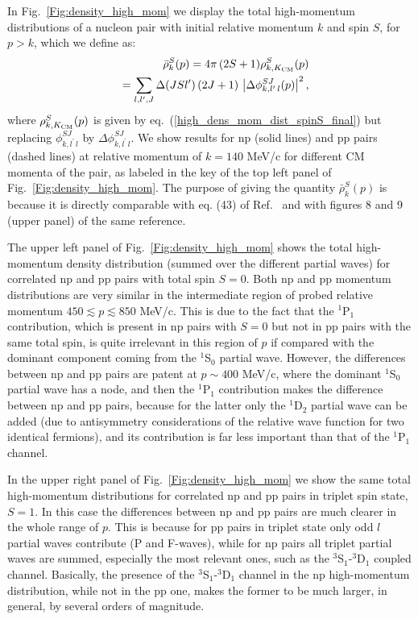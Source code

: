 \documentclass[aps,twocolumn,showpacs,preprintnumbers,amsmath,amssymb,nofootinbib,superscriptaddress,showkeys,noeprint]{revtex4-1}
\begin{document}
In Fig.~\ref{Fig:density_high_mom} we display the total high-momentum
distributions of a nucleon pair with initial relative momentum $k$ and
spin $S$, for $p>k$, which we define as:
\begin{eqnarray}
&&\bar{\rho}^{S}_{k}(p)=
4\pi\,(2S+1)
\rho^{S}_{k,K_{\rm CM}}(p)
\nonumber\\
&&=\sum_{l,l^\prime,J}
\Delta(JSl^\prime)\,(2J+1)\,
\left|\Delta\phi^{SJ}_{k,l^\prime\,l}(p)\right|^2,
\label{high_density_mom_dist_spin}
\end{eqnarray} 
where $\rho^{S}_{k,K_{\rm CM}}(p)$ is given by
eq.~(\ref{high_dens_mom_dist_spinS_final}) but replacing
$\phi^{SJ}_{k,l^\prime\,l}$ by $\Delta\phi^{SJ}_{k,l^\prime\,l}$.  We
show results for np (solid lines) and pp pairs (dashed lines) at
relative momentum of $k=140$ MeV/c for different CM momenta of the
pair, as labeled in the key of the top left panel of
Fig.~\ref{Fig:density_high_mom}.  The purpose of giving the quantity
$\bar{\rho}^{S}_{k}(p)$ is because it is directly comparable with
eq. (43) of Ref.~\cite{RuizSimo:2017tcb} and with figures 8 and 9
(upper panel) of the same reference.

The upper left panel of Fig.~\ref{Fig:density_high_mom} shows the
total high-momentum density distribution (summed over the different
partial waves) for correlated np and pp pairs with total spin $S=0$.
Both np and pp momentum distributions are very similar in the
intermediate region of probed relative momentum $450\lesssim p
\lesssim 850$ MeV/c. This is due to the fact that the ${}^{1}$P$_1$
contribution, which is present in np pairs with $S=0$ but not in pp
pairs with the same total spin, is quite irrelevant in this region of
$p$ if compared with the dominant component coming from the
${}^{1}$S$_0$ partial wave. However, the differences between np and pp
pairs are patent at $p\sim 400$ MeV/c, where the dominant
${}^{1}$S$_0$ partial wave has a node, and then the ${}^{1}$P$_1$
contribution makes the difference between np and pp pairs, because for
the latter only the ${}^{1}$D$_2$ partial wave can be added (due to
antisymmetry considerations of the relative wave function for two
identical fermions), and its contribution is far less important than
that of the ${}^{1}$P$_1$ channel.


In the upper right panel of Fig.~\ref{Fig:density_high_mom} we show
the same total high-momentum distributions for correlated np and pp
pairs in triplet spin state, $S=1$. In this case the differences
between np and pp pairs are much clearer in the whole range of
$p$. This is because for pp pairs in triplet state only odd $l$
partial waves contribute (P and F-waves), while for np pairs all
triplet partial waves are summed, especially the most relevant ones,
such as the ${}^{3}$S$_1$-${}^{3}$D$_1$ coupled channel. Basically,
the presence of the ${}^{3}$S$_1$-${}^{3}$D$_1$ channel in the np
high-momentum distribution, while not in the pp one, makes the former
to be much larger, in general, by several orders of magnitude.
\end{document}
